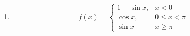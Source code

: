 \documentclass[11pt]{article}
\begin{document}
\begin{enumerate}
\begin{enumerate}

\item \[f(x)=\begin{cases} 1+\sin x, & x<0 \\ \cos x, & 0\leq x<\pi \\ \sin x & x\geq \pi \end{cases} \]


\end{enumerate}












%







\end{enumerate}
\end{document}
